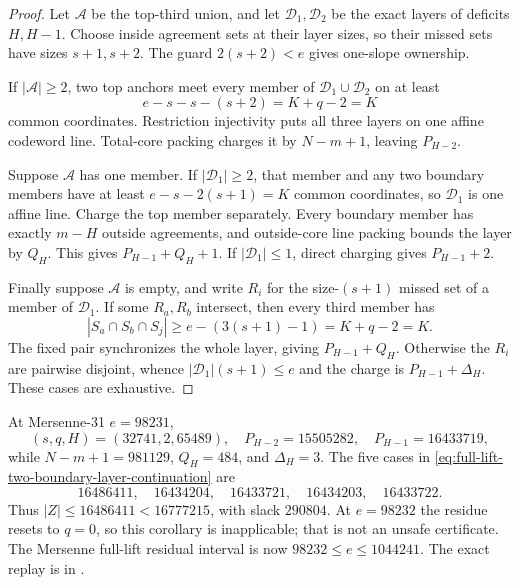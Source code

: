 \documentclass[11pt,a4paper]{amsart}
\numberwithin{equation}{section}
\theoremstyle{remark}
\begin{document}
\begin{proof}
Let $\mathcal A$ be the top-third union, and let
$\mathcal D_1,\mathcal D_2$ be the exact layers of deficits $H,H-1$.
Choose inside agreement sets at their layer sizes, so their missed sets
have sizes $s+1,s+2$.  The guard $2(s+2)<e$ gives one-slope ownership.

If $|\mathcal A|\ge2$, two top anchors meet every member of
$\mathcal D_1\cup\mathcal D_2$ on at least
\[
 e-s-s-(s+2)=K+q-2=K
\]
common coordinates.  Restriction injectivity puts all three layers on one
affine codeword line.  Total-core packing charges it by $N-m+1$, leaving
$P_{H-2}$.

Suppose $\mathcal A$ has one member.  If $|\mathcal D_1|\ge2$, that member
and any two boundary members have at least
$e-s-2(s+1)=K$ common coordinates, so $\mathcal D_1$ is one affine line.
Charge the top member separately.  Every boundary member has exactly
$m-H$ outside agreements, and outside-core line packing bounds the layer by
$Q_H$.  This gives $P_{H-1}+Q_H+1$.  If
$|\mathcal D_1|\le1$, direct charging gives $P_{H-1}+2$.

Finally suppose $\mathcal A$ is empty, and write $R_i$ for the size-$(s+1)$
missed set of a member of $\mathcal D_1$.  If some $R_a,R_b$ intersect,
then every third member has
\[
 |S_a\cap S_b\cap S_j|
 \ge e-(3(s+1)-1)=K+q-2=K.
\]
The fixed pair synchronizes the whole layer, giving $P_{H-1}+Q_H$.
Otherwise the $R_i$ are pairwise disjoint, whence
$|\mathcal D_1|(s+1)\le e$ and the charge is
$P_{H-1}+\Delta_H$.  These cases are exhaustive.
\end{proof}

\begin{remark}
At Mersenne-31 $e=98231$,
\[
 (s,q,H)=(32741,2,65489),\quad
 P_{H-2}=15505282,\quad P_{H-1}=16433719,
\]
while $N-m+1=981129$, $Q_H=484$, and $\Delta_H=3$.  The five cases in
\eqref{eq:full-lift-two-boundary-layer-continuation} are
\[
 16486411,\quad16434204,\quad16433721,\quad16434203,\quad16433722.
\]
Thus $|Z|\le16486411<16777215$, with slack $290804$.  At $e=98232$ the
residue resets to $q=0$, so this corollary is inapplicable; that is not an
unsafe certificate.  The Mersenne full-lift residual interval is now
$98232\le e\le1044241$.  The exact replay is in
.
\end{remark}
\end{document}
